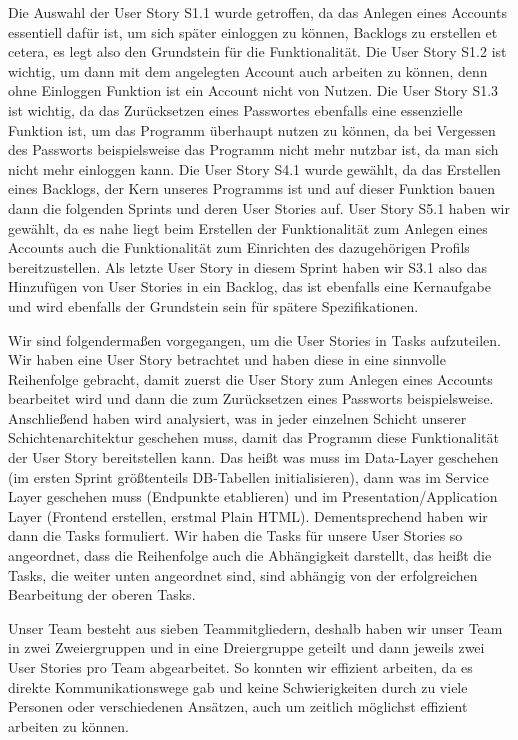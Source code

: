 \documentclass[a4paper,11pt]{article}
\begin{document}
Die Auswahl der User Story S1.1 wurde getroffen, da das Anlegen eines Accounts essentiell dafür ist, um sich später einloggen zu können, Backlogs zu erstellen et cetera, es legt also den Grundstein für die Funktionalität. Die User Story S1.2 ist wichtig, um dann mit dem angelegten Account auch arbeiten zu können, denn ohne Einloggen Funktion ist ein Account nicht von Nutzen. Die User Story S1.3 ist wichtig, da das Zurücksetzen eines Passwortes ebenfalls eine essenzielle Funktion ist, um das Programm überhaupt nutzen zu können, da bei Vergessen des Passworts beispielsweise das Programm nicht mehr nutzbar ist, da man sich nicht mehr einloggen kann. Die User Story S4.1 wurde gewählt, da das Erstellen eines Backlogs, der Kern unseres Programms ist und auf dieser Funktion bauen dann die folgenden Sprints und deren User Stories auf. User Story S5.1 haben wir gewählt, da es nahe liegt beim Erstellen der Funktionalität zum Anlegen eines Accounts auch die Funktionalität zum Einrichten des dazugehörigen Profils bereitzustellen. Als letzte User Story in diesem Sprint haben wir S3.1 also das Hinzufügen von User Stories in ein Backlog, das ist ebenfalls eine Kernaufgabe und wird ebenfalls der Grundstein sein für spätere Spezifikationen.

Wir sind folgendermaßen vorgegangen, um die User Stories in Tasks aufzuteilen. Wir haben eine User Story betrachtet und haben diese in eine sinnvolle Reihenfolge gebracht, damit zuerst die User Story zum Anlegen eines Accounts bearbeitet wird und dann die zum Zurücksetzen eines Passworts beispielsweise. Anschließend haben wird analysiert, was in jeder einzelnen Schicht unserer Schichtenarchitektur geschehen muss, damit das Programm diese Funktionalität der User Story bereitstellen kann. Das heißt was muss im Data-Layer geschehen (im ersten Sprint größtenteils DB-Tabellen initialisieren), dann was im Service Layer geschehen muss (Endpunkte etablieren) und im Presentation/Application Layer (Frontend erstellen, erstmal Plain HTML). Dementsprechend haben wir dann die Tasks formuliert. Wir haben die Tasks für unsere User Stories so angeordnet, dass die Reihenfolge auch die Abhängigkeit darstellt, das heißt die Tasks, die weiter unten angeordnet sind, sind abhängig von der erfolgreichen Bearbeitung der oberen Tasks.

Unser Team besteht aus sieben Teammitgliedern, deshalb haben wir unser Team in zwei Zweiergruppen und in eine Dreiergruppe geteilt und dann jeweils zwei User Stories pro Team abgearbeitet. So konnten wir effizient arbeiten, da es direkte Kommunikationswege gab und keine Schwierigkeiten durch zu viele Personen oder verschiedenen Ansätzen, auch um zeitlich möglichst effizient arbeiten zu können.
\end{document}
